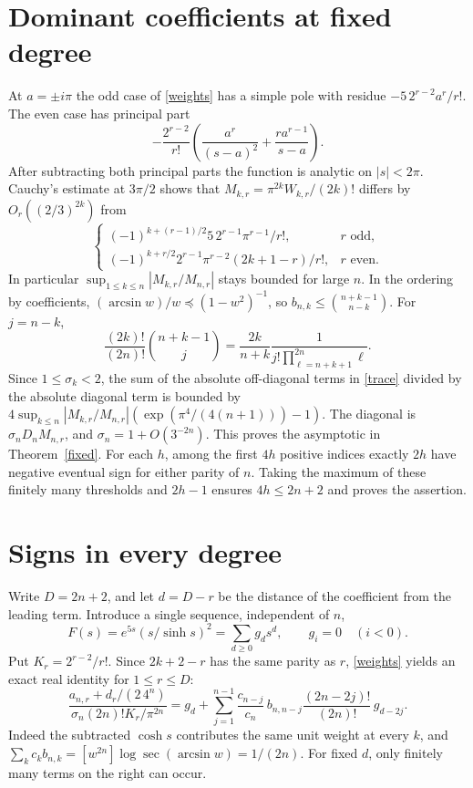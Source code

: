 \documentclass[11pt]{article}
\begin{document}
\section{Dominant coefficients at fixed degree}

At \(a=\pm i\pi\) the odd case of \eqref{weights} has a simple pole with
residue \(-5\,2^{r-2}a^r/r!\). The even case has principal part
\[
 -\frac{2^{r-2}}{r!}\left(\frac{a^r}{(s-a)^2}
                              +\frac{ra^{r-1}}{s-a}\right).
\]
After subtracting both principal parts the function is analytic on
\(|s|<2\pi\). Cauchy's estimate at \(3\pi/2\) shows that
\(M_{k,r}=\pi^{2k}W_{k,r}/(2k)!\) differs by \(O_r((2/3)^{2k})\) from
\[
 \begin{cases}
 (-1)^{k+(r-1)/2}5\,2^{r-1}\pi^{r-1}/r!,&r\text{ odd},\\
 (-1)^{k+r/2}2^{r-1}\pi^{r-2}(2k+1-r)/r!,&r\text{ even}.
 \end{cases}
\]
In particular \(\sup_{1\le k\le n}|M_{k,r}/M_{n,r}|\) stays bounded
for large \(n\). In the ordering by coefficients,
\((\arcsin w)/w\preceq(1-w^2)^{-1}\), so
\(b_{n,k}\le\binom{n+k-1}{n-k}\). For \(j=n-k\),
\[
 \frac{(2k)!}{(2n)!}\binom{n+k-1}{j}
 =\frac{2k}{n+k}\frac1{j!\prod_{\ell=n+k+1}^{2n}\ell}.
\]
Since \(1\le\sigma_k<2\), the sum of the absolute off-diagonal terms
in \eqref{trace} divided by the absolute diagonal term is bounded by
\(4\sup_{k\le n}|M_{k,r}/M_{n,r}|
(\exp(\pi^4/(4(n+1)))-1)\). The diagonal is \(\sigma_n D_n M_{n,r}\),
and \(\sigma_n=1+O(3^{-2n})\). This proves the asymptotic in
Theorem~\ref{fixed}. For each \(h\), among the first \(4h\) positive
indices exactly \(2h\) have negative eventual sign for either parity of
\(n\). Taking the maximum of these finitely many thresholds and \(2h-1\) ensures \(4h\le2n+2\) and proves the assertion.

\section{Signs in every degree}

Write \(D=2n+2\), and let \(d=D-r\) be the distance of the coefficient
from the leading term. Introduce a single sequence, independent of \(n\),
\[
 F(s)=e^{5s}(s/\sinh s)^2=\sum_{d\ge0}g_ds^d,\qquad g_i=0\quad(i<0).
\]
Put \(K_r=2^{r-2}/r!\). Since \(2k+2-r\) has the same parity as \(r\),
\eqref{weights} yields an exact real identity for \(1\le r\le D\):
\[
 \frac{a_{n,r}+d_r/(2\,4^n)}
      {\sigma_n(2n)!K_r/\pi^{2n}}
   = g_d+\sum_{j=1}^{n-1}
 \frac{c_{n-j}}{c_n}\, b_{n,n-j}
 \frac{(2n-2j)!}{(2n)!}\,g_{d-2j}.
 \tag{*}
\]
Indeed the subtracted \(\cosh s\) contributes the same unit weight at
every \(k\), and
\(\sum_kc_k b_{n,k}=[w^{2n}]\log\sec(\arcsin w)=1/(2n)\).
For fixed \(d\), only finitely many terms on the right can occur.
\end{document}
